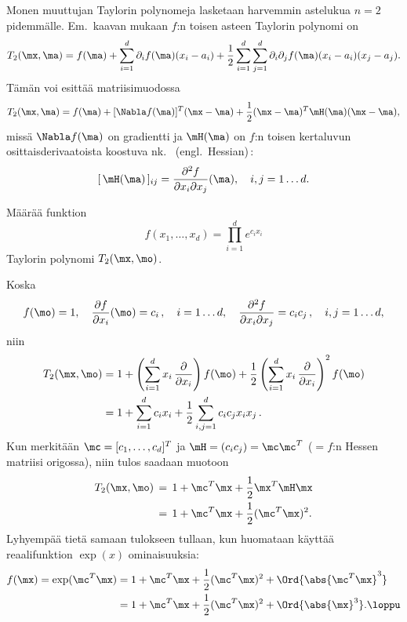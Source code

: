 Monen muuttujan Taylorin polynomeja lasketaan harvemmin astelukua $n=2$ pidemmälle.
Em.\ kaavan mukaan $f$:n toisen asteen Taylorin polynomi on
\[
T_2(\mx,\ma) 
= f(\ma)+\sum_{i=1}^d \partial_i f(\ma)(x_i-a_i)
        + \frac{1}{2} \sum_{i=1}^d\sum_{j=1}^d \partial_i\partial_j f(\ma)(x_i-a_i)(x_j-a_j).
\]
Tämän voi esittää matriisimuodossa
\[
T_2(\mx,\ma)=f(\ma)+[\Nabla f(\ma)]^T(\mx-\ma)+\frac{1}{2}(\mx-\ma)^T\mH(\ma)(\mx-\ma),
\]
missä $\Nabla f(\ma)$ on gradientti ja $\mH(\ma)$ on $f$:n toisen kertaluvun
osittaisderivaatoista koostuva nk.\
%
 (engl.\ Hessian)\,:
\[
[\,\mH(\ma)\,]_{ij}=\frac{\partial^2 f}{\partial x_i\partial x_j}(\ma),\quad i,j=1\ldots d.
\]
\begin{Exa}
Määrää funktion
\[
f(x_1,\ldots,x_d)=\prod_{i=1}^d e^{c_i x_i}
\]
Taylorin polynomi $T_2(\mx,\mo)$.
\end{Exa}
\ratk Koska
\[
f(\mo)=1,\quad \frac{\partial f}{\partial x_i}(\mo)=c_i\,,\quad i=1\ldots d, \quad
\frac{\partial^2 f}{\partial x_i\partial x_j} = c_i c_j\,,\quad i,j=1\ldots d,
\]
niin
\begin{align*}
T_2(\mx,\mo) &= 1+\left(\sum_{i=1}^d x_i\,
                \frac{\partial}{\partial x_i}\right)f(\mo)+\frac{1}{2}\left(\sum_{i=1}^d 
                         x_i\,\frac{\partial}{\partial x_i}\right)^2f(\mo) \\
             &= 1 + \sum_{i=1}^d c_i x_i+\frac{1}{2}\sum_{i,j=1}^d c_i c_j x_i x_j\,.
\end{align*}
Kun merkitään $\mc=[c_1,\ldots,c_d]^T$ ja $\mH=(c_ic_j)=\mc\mc^T$ 
($=f$:n Hessen matriisi origossa), niin tulos saadaan muotoon
\begin{align*}
T_2(\mx,\mo) \,&=\, 1 + \mc^T\mx + \frac{1}{2} \mx^T\mH\mx \\
             \,&=\, 1 + \mc^T\mx + \frac{1}{2} (\mc^T\mx)^2.
\end{align*}
Lyhyempää tietä samaan tulokseen tullaan, kun huomataan käyttää reaalifunktion
$\exp(x)$ ominaisuuksia:
\begin{align*}
f(\mx) = \exp({\mc^T\mx}) &= 1+\mc^T\mx+\frac{1}{2}(\mc^T\mx)^2+\Ord{\abs{\mc^T\mx}^3} \\
                          &= 1+\mc^T\mx+\frac{1}{2}(\mc^T\mx)^2+\Ord{\abs{\mx}^3}. \loppu
\end{align*}

